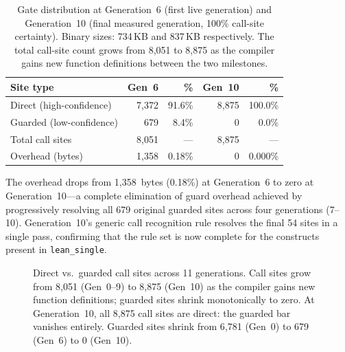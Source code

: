 \documentclass[acmsmall,screen,review,anonymous]{acmart}
\newcommand{\lean}{\texttt{lean\_single}\xspace}
\begin{document}
\begin{table}[h]
\centering
\small
\begin{tabular}{@{}lrrrr@{}}
\toprule
Site type & Gen~6 & \% & Gen~10 & \% \\
\midrule
Direct (high-confidence) & 7,372 & 91.6\% & 8,875 & 100.0\% \\
Guarded (low-confidence) &   679 &  8.4\% &     0 &   0.0\% \\
\midrule
Total call sites          & 8,051 & ---    & 8,875 & ---     \\
Overhead (bytes)          & 1,358 & 0.18\% &     0 & 0.000\% \\
\bottomrule
\end{tabular}
\caption{Gate distribution at Generation~6 (first live generation) and
  Generation~10 (final measured generation, 100\% call-site certainty).
  Binary sizes: 734\,KB and 837\,KB respectively.
  The total call-site count grows from 8,051 to 8,875 as the compiler
  gains new function definitions between the two milestones.}
\label{tab:gates}
\end{table}

The overhead drops from 1,358~bytes (0.18\%) at Generation~6 to zero
at Generation~10---a complete elimination of guard overhead achieved by
progressively resolving all 679 original guarded sites across four
generations (7--10).
Generation~10's generic call recognition rule resolves the final 54 sites
in a single pass, confirming that the rule set is now complete for the
constructs present in \lean.

\begin{figure}[t]
\centering
{}
\caption{%
  Direct vs.\ guarded call sites across 11 generations.
  Call sites grow from 8,051 (Gen~0--9) to 8,875 (Gen~10) as the compiler
  gains new function definitions; guarded sites shrink monotonically to zero.
  At Generation~10, all 8,875 call sites are direct: the guarded bar
  vanishes entirely.
  Guarded sites shrink from 6,781 (Gen~0) to 679 (Gen~6) to 0 (Gen~10).
}
\label{fig:gates}
\end{figure}
\end{document}
